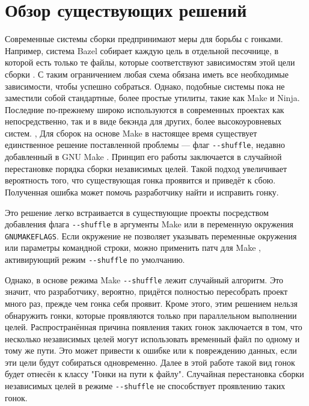\section{Обзор существующих решений}
\label{sec:Chapter2} 


Современные системы сборки предпринимают меры для борьбы с гонками. Например, система Bazel собирает каждую цель в отдельной песочнице, в которой есть только те файлы, которые соответствуют зависимостям этой цели сборки \cite{bazel-sandbox}. С таким ограничением любая схема обязана иметь все необходимые зависимости, чтобы успешно собраться. Однако, подобные системы пока не заместили собой стандартные, более простые утилиты, такие как Make и Ninja. Последние по-прежнему широко используются в современных проектах как непосредственно, так и в виде бекэнда для других, более высокоуровневых систем.
,
Для сборок на основе Make в настоящее время существует единственное решение поставленной проблемы --- флаг \texttt{{-}{-}shuffle}, недавно добавленный в GNU Make \cite{trofi-make-shuffle}. Принцип его работы заключается в случайной перестановке порядка сборки независимых целей. Такой подход увеличивает вероятность того, что существующая гонка проявится и приведёт к сбою. Полученная ошибка может помочь разработчику найти и исправить гонку.

Это решение легко встраивается в существующие проекты посредством добавления флага \texttt{{-}{-}shuffle} в аргументы Make или в переменную окружения \texttt{GNUMAKEFLAGS}. Если окружение не позволяет указывать переменные окружения или параметры командной строки, можно применить патч для Make \cite{make-shuffle-patch}, активирующий режим \texttt{{-}{-}shuffle} по умолчанию.

Однако, в основе режима Make \texttt{{-}{-}shuffle} лежит случайный алгоритм. Это значит, что разработчику, вероятно, придётся полностью пересобрать проект много раз, прежде чем гонка себя проявит. Кроме этого, этим решением нельзя обнаружить гонки, которые проявляются только при параллельном выполнении целей. Распространённая причина появления таких гонок заключается в том, что несколько независимых целей могут использовать временный файл по одному и тому же пути. Это может привести к ошибке или к повреждению данных, если эти цели будут собираться одновременно. Далее в этой работе такой вид гонок будет отнесён к классу "Гонки на пути к файлу". Случайная перестановка сборки независимых целей в режиме \texttt{{-}{-}shuffle} не способствует проявлению таких гонок.